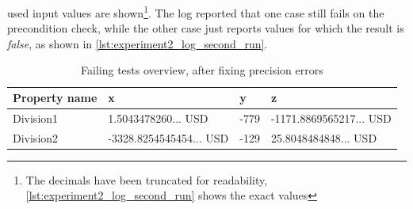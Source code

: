 used input values are shown\footnote{The decimals have been truncated for
readability, \autoref{lst:experiment2_log_second_run} shows the exact values}.
The log reported that one case still fails on the precondition check, while the
other case just reports values for which the result is \textit{false}, as shown
in \autoref{lst:experiment2_log_second_run}.
\begin{table}[!ht]
\centering
\begin{tabular}{llll}
\hline
\textbf{Property name} & \textbf{x}                               & \textbf{y} & \textbf{z}                               \\ \hline
Division1              & 1.5043478260... USD     & -779       & -1171.8869565217... USD \\
Division2              & -3328.8254545454... USD & -129       & 25.8048484848... USD    \\ \hline
\end{tabular}
\caption{Failing tests overview, after fixing precision errors}
\label{tbl:experiment2_overview_second_run}
\end{table}
\FloatBarrier\noindent

